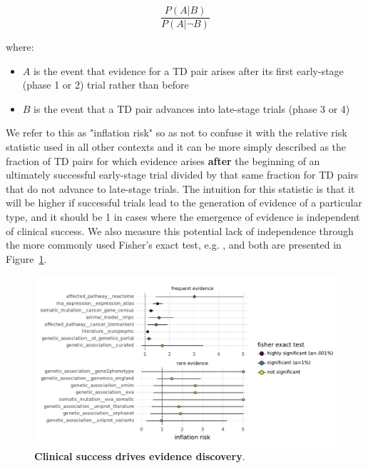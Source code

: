 \documentclass{article}
\begin{document}
\begin{equation}
  \frac{P(A | B)}{P(A | \neg B)}
\end{equation}

where:

\begin{itemize}
\item \(A\) is the event that evidence for a TD pair arises after its first early-stage (phase 1 or 2) trial rather than before
\item \(B\) is the event that a TD pair advances into late-stage trials (phase 3 or 4)
\end{itemize}

We refer to this as "inflation risk" so as not to confuse it with the relative risk statistic used in all other contexts and it can be more simply described as the fraction of TD pairs for which evidence arises \textbf{after} the beginning of an ultimately successful early-stage trial divided by that same fraction for TD pairs that do not advance to late-stage trials. The intuition for this statistic is that it will be higher if successful trials lead to the generation of evidence of a particular type, and it should be 1 in cases where the emergence of evidence is independent of clinical success. We also measure this potential lack of independence through the more commonly used Fisher's exact test, e.g. \cite{PMID:19725948}, and both are presented in Figure~\ref{fig:evidence_inflation}.

\begin{figure}[!htb]
  \centering
  \captionsetup{width=.9\linewidth}
  \includegraphics[width=1\textwidth]{evidence_inflation.pdf}
  \caption{
    \textbf{Clinical success drives evidence discovery}.  
  }
  \label{fig:evidence_inflation}
\end{figure}
\end{document}
